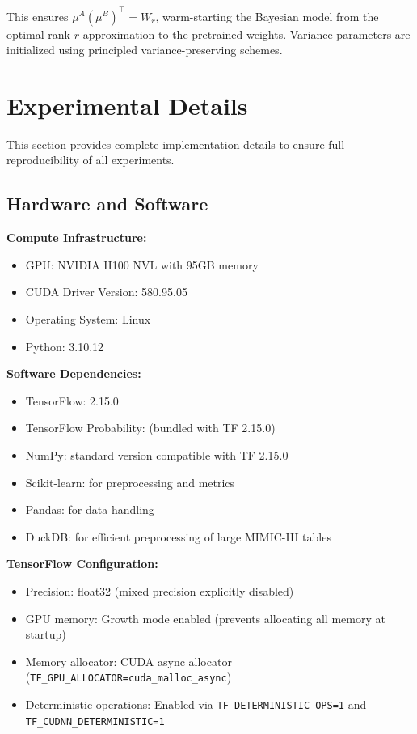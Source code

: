 \documentclass{article}
\theoremstyle{plain}
\theoremstyle{definition}
\theoremstyle{remark}
\begin{document}
This ensures $\mu^A (\mu^B)^\top = W_r$, warm-starting the Bayesian model from the optimal rank-$r$ approximation to the pretrained weights. Variance parameters are initialized using principled variance-preserving schemes.


\section{Experimental Details}\label{app:experimental_details}

This section provides complete implementation details to ensure full reproducibility of all experiments.

\subsection{Hardware and Software}\label{app:hardware}

\textbf{Compute Infrastructure:}
\begin{itemize}
    \item GPU: NVIDIA H100 NVL with 95GB memory
    \item CUDA Driver Version: 580.95.05
    \item Operating System: Linux
    \item Python: 3.10.12
\end{itemize}

\textbf{Software Dependencies:}
\begin{itemize}
    \item TensorFlow: 2.15.0
    \item TensorFlow Probability: (bundled with TF 2.15.0)
    \item NumPy: standard version compatible with TF 2.15.0
    \item Scikit-learn: for preprocessing and metrics
    \item Pandas: for data handling
    \item DuckDB: for efficient preprocessing of large MIMIC-III tables
\end{itemize}

\textbf{TensorFlow Configuration:}
\begin{itemize}
    \item Precision: float32 (mixed precision explicitly disabled)
    \item GPU memory: Growth mode enabled (prevents allocating all memory at startup)
    \item Memory allocator: CUDA async allocator (\texttt{TF\_GPU\_ALLOCATOR=cuda\_malloc\_async})
    \item Deterministic operations: Enabled via \texttt{TF\_DETERMINISTIC\_OPS=1} and \texttt{TF\_CUDNN\_DETERMINISTIC=1}
\end{itemize}
\end{document}
